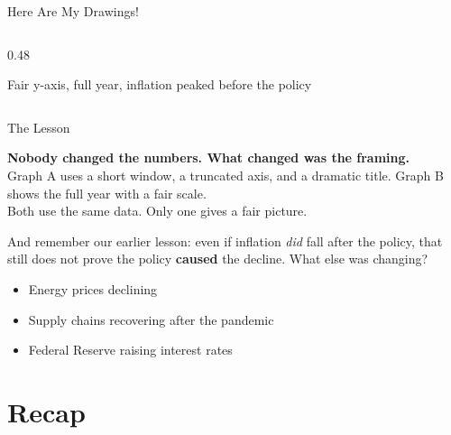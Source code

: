 \documentclass[9pt,english,aspectratio=169]{beamer}
\begin{document}
\begin{frame}{Here Are My Drawings!}
\begin{columns}[T]
\begin{column}{0.48\textwidth}

      {\tiny Fair y-axis, full year, inflation peaked before the policy}
    \end{column}
  \end{columns}

\end{frame}

\begin{frame}{The Lesson}

  \begin{insightbox}
    \textbf{Nobody changed the numbers. What changed was the framing.}\\[0.3em]
    Graph A uses a short window, a truncated axis, and a dramatic title. Graph B shows the full year with a fair scale.\\[0.3em]
    Both use the same data. Only one gives a fair picture.
  \end{insightbox}

  \vspace{0.8em}
  And remember our earlier lesson: even if inflation \emph{did} fall after the policy, that still does not prove the policy \textbf{caused} the decline. What else was changing?

  \vspace{0.5em}
  \begin{itemize}
    \item Energy prices declining
    \item Supply chains recovering after the pandemic
    \item Federal Reserve raising interest rates
  \end{itemize}

  \vspace{0.5em}

\end{frame}

\section{Recap}
\end{document}
